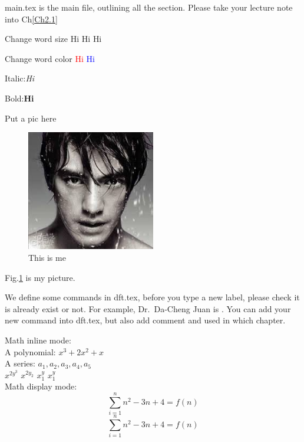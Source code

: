 main.tex is the main file, outlining all the section. Please take your lecture note into Ch\ref{Ch2.1}

Change word size \tiny{Hi} \Huge{Hi} \Large{Hi}

Change word color \textcolor{red}{Hi} \textcolor{blue}{Hi}

Italic:\textit{Hi}

Bold:\textbf{Hi}

Put a pic here
\begin{figure}[htb]
\centering
\includegraphics[width=0.5\textwidth]{FIG/mypic.jpg}
\caption{This is me}
\label{mypic}
\end{figure}

Fig.\ref{mypic} is my picture.

We define some commands in dft.tex, before you type a new label, please check it is already exist or not. For example, Dr.\ Da-Cheng Juan is \DC\@. You can add your new command into dft.tex, but also add comment and used in which chapter.

Math inline mode:\\
A polynomial: $x^{3} + 2x^{2} + x$\\
A series: $a_{1}, a_{2}, a_{3}, a_{4}, a_{5}$\\
$x^{2y^{3}}$ $x^{2y_{2}}$ $x^{y}_{1}$ $x_{1}^{y}$\\

Math display mode:\\
\[
\sum_{i=1}^{n}{n^2-3n+4} = f(n)
\]
\begin{equation}
\label{myequation}
\sum_{i=1}^{n}{n^2-3n+4} = f(n)
\end{equation}

